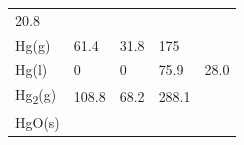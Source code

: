 \documentclass[
  9pt,
]{extbook}
\theoremstyle{definition}
\theoremstyle{definition}
\theoremstyle{definition}
\theoremstyle{remark}
\begin{document}
\begin{longtable}[]{@{}lllll@{}}
\begin{minipage}[t]{0.18\columnwidth}
20.8\strut
\end{minipage}\tabularnewline
\begin{minipage}[t]{0.10\columnwidth}\raggedright
Hg(g)\strut
\end{minipage} & \begin{minipage}[t]{0.19\columnwidth}\raggedright
61.4\strut
\end{minipage} & \begin{minipage}[t]{0.20\columnwidth}\raggedright
31.8\strut
\end{minipage} & \begin{minipage}[t]{0.18\columnwidth}\raggedright
175\strut
\end{minipage} & \begin{minipage}[t]{0.18\columnwidth}\raggedright
\strut
\end{minipage}\tabularnewline
\begin{minipage}[t]{0.10\columnwidth}\raggedright
Hg(l)\strut
\end{minipage} & \begin{minipage}[t]{0.19\columnwidth}\raggedright
0\strut
\end{minipage} & \begin{minipage}[t]{0.20\columnwidth}\raggedright
0\strut
\end{minipage} & \begin{minipage}[t]{0.18\columnwidth}\raggedright
75.9\strut
\end{minipage} & \begin{minipage}[t]{0.18\columnwidth}\raggedright
28.0\strut
\end{minipage}\tabularnewline
\begin{minipage}[t]{0.10\columnwidth}\raggedright
Hg\textsubscript{2}(g)\strut
\end{minipage} & \begin{minipage}[t]{0.19\columnwidth}\raggedright
108.8\strut
\end{minipage} & \begin{minipage}[t]{0.20\columnwidth}\raggedright
68.2\strut
\end{minipage} & \begin{minipage}[t]{0.18\columnwidth}\raggedright
288.1\strut
\end{minipage} & \begin{minipage}[t]{0.18\columnwidth}\raggedright
\strut
\end{minipage}\tabularnewline
\begin{minipage}[t]{0.10\columnwidth}\raggedright
HgO(s)\strut

\end{minipage}
\end{longtable}
\end{document}
